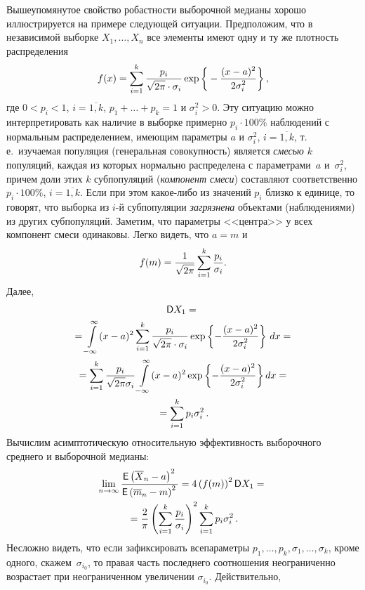 \begin{multicols}{2}
Вышеупомянутое свойство робастности выборочной медианы хорошо
иллюстрируется на примере следующей ситуации. Предположим, что в
независимой выборке $X_1,\ldots,X_n$ все элементы имеют одну и ту
же плотность распределения
$$
f(x)=\sum\limits_{i=1}^k\displaystyle\frac{\displaystyle p_i\mathstrut}{\displaystyle \sqrt{2\pi}\cdot\sigma_i\mathstrut}\exp\bigg\{-\displaystyle\frac{\displaystyle (x-a)^2\mathstrut}{\displaystyle 2\sigma_i^2\mathstrut}\bigg\}\,,
$$
где $0<p_i<1$, $i=\overline{1,k}$, $p_1 + \ldots + p_k=1$ и
$\sigma_i^2>0$. Эту ситуацию можно интерпретировать как наличие в
выборке примерно $p_i\cdot 100\%$ наблюдений с нормальным
распределением, имеющим параметры $a$ и $\sigma_i^2$,
$i=\overline{1,k}$, т.\,е.\ изучаемая популяция (генеральная
совокупность) является {\it смесью} $k$ популяций, каждая из
которых нормально распределена с параметрами~$a$ и~$\sigma_i^2$,
причем доли этих $k$ субпопуляций ({\it компонент смеси})
составляют соответственно $p_i\cdot 100\%$, $i=\overline{1,k}$.
Если при этом какое-либо из значений $p_i$ близко к единице, то
говорят, что выборка из $i$-й субпопуляции {\it загрязнена}
объектами (наблюдениями) из других субпопуляций. Заметим, что
па\-ра\-мет\-ры <<центра>> у всех компонент смеси одинаковы. Легко
видеть, что $a=m$ и
$$
f(m)=\displaystyle\frac{\displaystyle 1\mathstrut}{\displaystyle \sqrt{2\pi}\mathstrut}\sum\limits_{i=1}^k\displaystyle\frac{\displaystyle p_i\mathstrut}{\displaystyle \sigma_i\mathstrut}.
$$
Далее,
\begin{multline*}
{\sf
D}X_1={}\\
{}=\int\limits_{-\infty}^{\infty}(x-a)^2\sum\limits_{i=1}^k\displaystyle\frac{\displaystyle p_i\mathstrut}{\displaystyle \sqrt{2\pi}\cdot\sigma_i\mathstrut}\exp\left\{
-\displaystyle\frac{\displaystyle (x-a)^2\mathstrut}{\displaystyle 2\sigma_i^2\mathstrut}\right\}\,dx={}
\\{}
=\sum\limits_{i=1}^k\displaystyle\frac{\displaystyle p_i\mathstrut}{\displaystyle \sqrt{2\pi}\sigma_i\mathstrut}\int\limits_{-\infty}^{\infty}(x-a)^2
\exp\left\{-\displaystyle\frac{\displaystyle (x-a)^2\mathstrut}{\displaystyle 2\sigma_i^2\mathstrut}\right\}dx={}\\
{}= \sum\limits_{i=1}^kp_i\sigma_i^2\,.
\end{multline*}
Вычислим асимптотическую относительную эффективность выборочного
среднего и выборочной медианы:
\begin{multline*}
\lim_{n\to\infty}\displaystyle\frac{\displaystyle {\sf E}\left(\overline X_n-a\right)^2\mathstrut}{\displaystyle {\sf
E}\left(\overline m_n-m\right)^2\mathstrut}= 4\left(f(m)\right)^2{\sf D}X_1={}\\
{}=\displaystyle\frac{\displaystyle 2\mathstrut}{\displaystyle \pi\mathstrut}\left(\sum\limits_{i=1}^k\displaystyle\frac{\displaystyle p_i\mathstrut}{\displaystyle \sigma_i\mathstrut}\right)^2
\sum\limits_{i=1}^kp_i\sigma_i^2\,.
\end{multline*}
Несложно видеть, что если зафиксировать все\linebreak параметры
$p_1,\ldots,p_k,\sigma_1,\ldots,\sigma_k$, кроме одного,
скажем~$\sigma_{i_0}$, то правая часть последнего соотношения
неограниченно возрастает при неограниченном увеличении
$\sigma_{i_0}$. Действительно,

\end{multicols}
